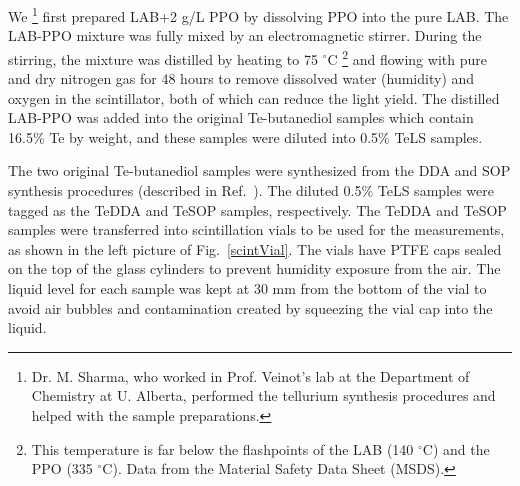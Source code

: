 We \footnote{Dr. M. Sharma, who worked in Prof. Veinot's lab at the Department of Chemistry at U. Alberta, performed the tellurium synthesis procedures and helped with the sample preparations.} first prepared LAB+2 g/L PPO by dissolving PPO into the pure LAB. The LAB-PPO mixture was fully mixed by an electromagnetic stirrer. During the stirring, the mixture was distilled by heating to 75 $^\circ$C \footnote{This temperature is far below the flashpoints of the LAB (140 $^\circ$C) and the PPO (335 $^\circ$C). Data from the Material Safety Data Sheet (MSDS).} and flowing with pure and dry nitrogen gas for 48 hours to remove dissolved water (humidity) and oxygen in the scintillator, both of which can reduce the light yield. The distilled LAB-PPO was added into the original Te-butanediol samples which contain 16.5\% Te by weight, and these samples were diluted into 0.5\% TeLS samples. 

The two original Te-butanediol samples were synthesized from the DDA and SOP synthesis procedures (described in Ref.~\cite{teLoadingPaper}). The diluted 0.5\% TeLS samples were tagged as the TeDDA and TeSOP samples, respectively. The TeDDA and TeSOP samples were transferred into scintillation vials to be used for the measurements, as shown in the left picture of Fig.~\ref{scintVial}. The vials have PTFE caps sealed on the top of the glass cylinders to prevent humidity exposure from the air. The liquid level for each sample was kept at 30 mm from the bottom of the vial to avoid air bubbles and contamination created by squeezing the vial cap into the liquid.

